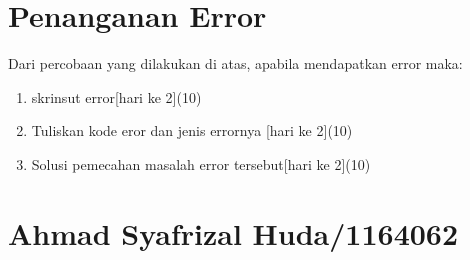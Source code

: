 \section{Penanganan Error}
Dari percobaan yang dilakukan di atas, apabila mendapatkan error maka:

\begin{enumerate}
	\item
	skrinsut error[hari ke 2](10)
	\item
Tuliskan kode eror dan jenis errornya [hari ke 2](10)
	\item
Solusi pemecahan masalah error tersebut[hari ke 2](10)

\end{enumerate}


\section{Ahmad Syafrizal Huda/1164062}
